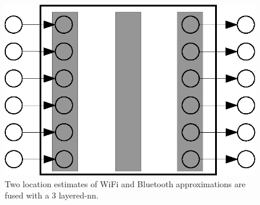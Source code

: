     \begin{figure}[thpb]
       \centering
       \includegraphics[width=0.95\linewidth]{figures/fusion.eps}
       \caption{\label{fig:fusion}Two location estimates of WiFi and Bluetooth approximations are fused with a 3 layered-\gls{nn}.}
    \end{figure}
